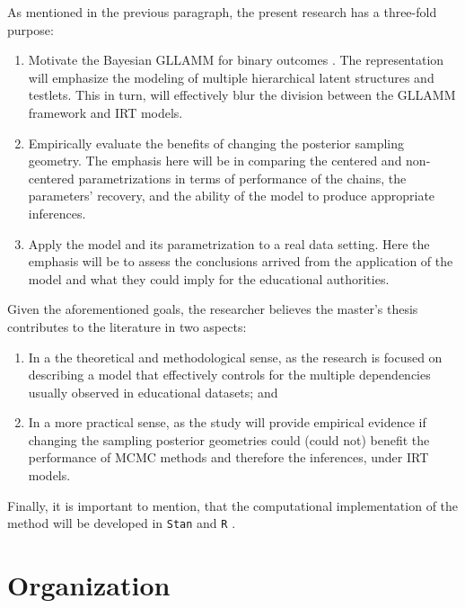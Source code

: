 As mentioned in the previous paragraph, the present research has a three-fold purpose:

\begin{enumerate}
	\item Motivate the Bayesian GLLAMM for binary outcomes \cite{Rabe_et_al_2004a, Rabe_et_al_2004b, Skrondal_et_al_2004a, Rabe_et_al_2012}. The representation will emphasize the modeling of multiple hierarchical latent structures and testlets. This in turn, will effectively blur the division between the GLLAMM framework and IRT models.
	
	\item Empirically evaluate the benefits of changing the posterior sampling geometry. The emphasis here will be in comparing the centered and non-centered parametrizations \cite{Gelfand_et_al_1995, Gelfand_et_al_1996} in terms of performance of the chains, the parameters' recovery, and the ability of the model to produce appropriate inferences.
	
	\item Apply the model and its parametrization to a real data setting. Here the emphasis will be to assess the conclusions arrived from the application of the model and what they could imply for the educational authorities.
\end{enumerate}

\noindent Given the aforementioned goals, the researcher believes the master's thesis contributes to the literature in two aspects: 

\begin{enumerate}
	\item In a the theoretical and methodological sense, as the research is focused on describing a model that effectively controls for the multiple dependencies usually observed in educational datasets; and 
	
	\item In a more practical sense, as the study will provide empirical evidence if changing the sampling posterior geometries could (could not) benefit the performance of MCMC methods and therefore the inferences, under IRT models.
\end{enumerate}

\noindent Finally, it is important to mention, that the computational implementation of the method will be developed in \texttt{Stan} \cite{Stan2020} and \texttt{R} \cite{R2015, RStan2020}.



\section{Organization}


